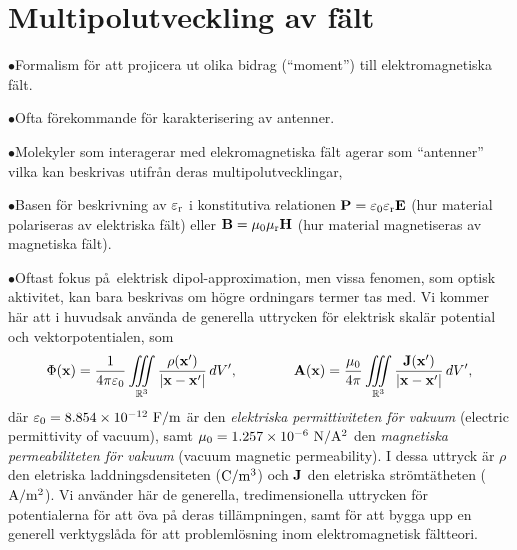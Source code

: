 \section{Multipolutveckling av f\"alt}
\item{$\bullet$}{Formalism f{\"o}r att projicera ut olika bidrag (``moment'')
   till elektromagnetiska f{\"a}lt.} 
\item{$\bullet$}{Ofta f{\"o}rekommande f{\"o}r karakterisering av antenner.}
\item{$\bullet$}{Molekyler som interagerar med elekromagnetiska f{\"a}lt agerar
   som ``antenner'' vilka kan beskrivas utifr{\aa}n deras multipolutvecklingar,}
\item{$\bullet$}{Basen f\"or beskrivning av $\varepsilon_{\rm r}$ i konstitutiva
   relationen ${\bf P}=\varepsilon_0\varepsilon_{\rm r}{\bf E}$ (hur material
   polariseras av elektriska f\"alt) eller ${\bf B}=\mu_0\mu_{\rm r}{\bf H}$
   (hur material magnetiseras av magnetiska f{\"a}lt).}
\item{$\bullet$}{Oftast fokus p\aa\ elektrisk dipol-approximation, men vissa
   fenomen, som optisk aktivitet, kan bara beskrivas om h{\"o}gre ordningars
   termer tas med.}
\medskip
\noindent
Vi kommer h{\"a}r att i huvudsak anv{\"a}nda de generella uttrycken f{\"o}r
elektrisk skal{\"a}r potential och vektorpotentialen,
som
$$
  \Phi({\bf x})={{1}\over{4\pi\varepsilon_0}}
    \iiint_{{\Bbb R}^3}{{\rho({\bf x}')}\over{|{\bf x}-{\bf x}'|}}\,dV',
    \qquad\qquad
  {\bf A}({\bf x})={{\mu_0}\over{4\pi}}
    \iiint_{{\Bbb R}^3}{{{\bf J}({\bf x}')}\over{|{\bf x}-{\bf x}'|}}\,dV',
$$
d{\"a}r $\varepsilon_0= 8.854\times10^{-12}\ {\rm F}/{\rm m}$ {\"a}r den
{\it elektriska permittiviteten f{\"o}r vakuum} (electric permittivity of
vacuum), samt $\mu_0=1.257\times10^{-6}\ {\rm N}/{\rm A}^2$ den {\it magnetiska
permeabiliteten f{\"o}r vakuum} (vacuum magnetic permeability). I dessa uttryck
{\"a}r $\rho$ den eletriska laddningsdensiteten (${\rm C}/{\rm m}^3$) och
${\bf J}$ den eletriska str{\"o}mt{\"a}theten (${\rm A}/{\rm m}^2$).
Vi anv{\"a}nder h{\"a}r de generella, tredimensionella uttrycken f{\"o}r
potentialerna f{\"o}r att {\"o}va p{\aa} deras till{\"a}mpningen, samt f{\"o}r
att bygga upp en generell verktygsl{\aa}da f{\"o}r att probleml{\"o}sning inom
elektromagnetisk f{\"a}ltteori.

